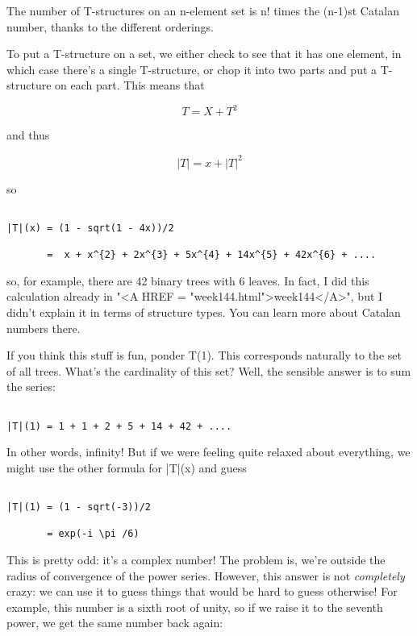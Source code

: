The number of T-structures on an n-element set is n! times the
(n-1)st Catalan number, thanks to the different orderings.

To put a T-structure on a set, we either check to see that it has one
element, in which case there's a single T-structure, or chop it into
two parts and put a T-structure on each part.  This means that


$$

T = X + T^{2}
$$
    
and thus


$$

|T| = x + |T|^{2}
$$
    
so 


\begin{verbatim}

|T|(x) = (1 - sqrt(1 - 4x))/2 

       =  x + x^{2} + 2x^{3} + 5x^{4} + 14x^{5} + 42x^{6} + ....
\end{verbatim}
    
so, for example, there are 42 binary trees with 6 leaves.  In fact, I did
this calculation already in "<A HREF = "week144.html">week144</A>", but I didn't explain it in terms
of structure types.  You can learn more about Catalan numbers there.

If you think this stuff is fun, ponder T(1).  This
corresponds naturally to the set of all trees. 
What's the cardinality of this set?  Well, the sensible answer
is to sum the series:

\begin{verbatim}

|T|(1) = 1 + 1 + 2 + 5 + 14 + 42 + ....
\end{verbatim}
    
In other words, infinity!  But if we were feeling
quite relaxed about everything, we might use the other formula
for |T|(x) and guess


\begin{verbatim}

|T|(1) = (1 - sqrt(-3))/2

       = exp(-i \pi /6)
\end{verbatim}
    
This is pretty odd: it's a complex number!   The problem is, we're
outside the radius of convergence of the power series.
However, this answer is not \emph{completely} crazy: we can use
it to guess things that would be hard to guess otherwise!
For example, this number is a sixth root of unity, so if we
raise it to the seventh power, we get the same
number back again:

